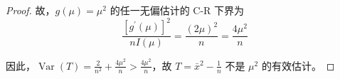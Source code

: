 \documentclass[normal,founder,mtpro2,cn]{elegantnote}
\begin{document}
\begin{enumerate}
\begin{proof}
            故，$g\left(\mu\right)=\mu^{2}$ 的任一无偏估计的 C-R 下界为
            \begin{equation*}
                \frac{\left[g^{\prime}\left(\mu\right)\right]^{2}}{nI\left(\mu\right)}=\frac{\left(2\mu\right)^{2}}{n}=\frac{4\mu^{2}}{n}
            \end{equation*}

            因此，$\operatorname{Var}\left(T\right)=\frac{2}{n^{2}}+\frac{4\mu^{2}}{n}>\frac{4\mu^{2}}{n}$，故 $T=\bar{x}^{2}-\frac{1}{n}$ 不是 $\mu^{2}$ 的有效估计。
        \end{proof}
\end{enumerate}
\end{document}
